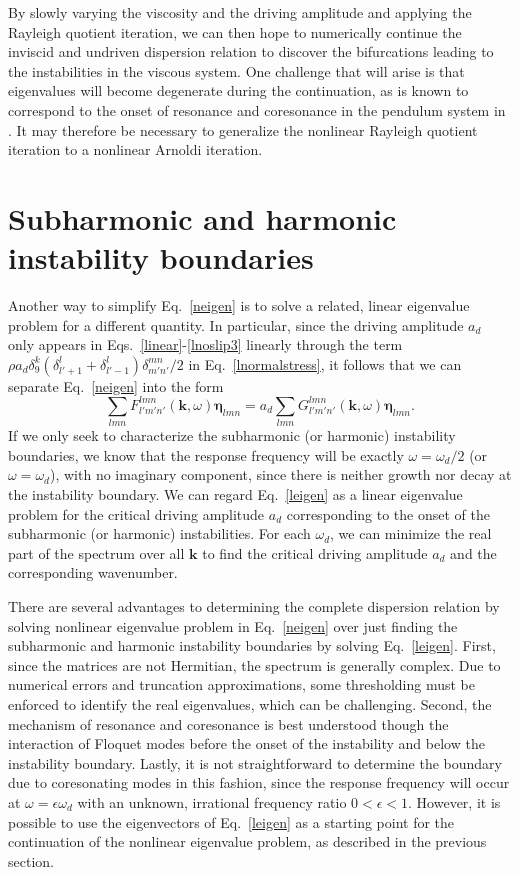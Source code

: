 \documentclass[aps,pre,amsmath,amssymb,floatfix,onecolumn,notitlepage,10pt]{revtex4-1}
\begin{document}
By slowly varying the viscosity and the driving amplitude and applying the Rayleigh quotient iteration, we can then hope to numerically continue the inviscid and undriven dispersion relation to discover the bifurcations leading to the instabilities in the viscous system. One challenge that will arise is that eigenvalues will become degenerate during the continuation, as is known to correspond to the onset of resonance and coresonance in the pendulum system in \cite{2021_Nicolaou_2}. It may therefore be necessary to generalize the nonlinear Rayleigh quotient iteration to a nonlinear Arnoldi iteration.

\section{Subharmonic and harmonic instability boundaries}
Another way to simplify Eq.~\eqref{neigen} is to solve a related, linear eigenvalue problem for a different quantity. In particular, since the driving amplitude $a_d$ only appears in Eqs.~\eqref{linear}-\eqref{lnoslip3} linearly through the term $\rho a_d\delta_9^k(\delta_{l'+1}^l+\delta_{l'-1}^l)\delta_{m'n'}^{mn}/2$ in Eq.~\eqref{lnormalstress}, it follows that we can separate Eq.~\eqref{neigen} into the form
\begin{equation}
\sum_{lmn} F^{lmn}_{l'm'n'}(\mathbf{k},\omega) \bm{\eta}_{lmn} = a_d \sum_{lmn}  G^{lmn}_{l'm'n'}(\mathbf{k},\omega)\bm{\eta}_{lmn}. \label{leigen}
\end{equation}
If we only seek to characterize the subharmonic (or harmonic) instability boundaries, we know that the response frequency will be exactly $\omega  = \omega_d/2$ (or $\omega  = \omega_d$), with no imaginary component, since there is neither growth nor decay at the instability boundary. We can regard Eq.~\eqref{leigen} as a linear eigenvalue problem for the critical driving amplitude $a_d$ corresponding to the onset of the subharmonic (or harmonic) instabilities. For each $\omega_d$, we can minimize the real part of the spectrum over all $\mathbf{k}$ to find the critical driving amplitude $a_d$ and the corresponding wavenumber.

There are several advantages to determining the complete dispersion relation by solving nonlinear eigenvalue problem in Eq.~\eqref{neigen} over just finding the subharmonic and harmonic instability boundaries by solving Eq.~\eqref{leigen}. First, since the matrices are not Hermitian, the spectrum is generally complex. Due to numerical errors and truncation approximations, some thresholding must be enforced to identify the real eigenvalues, which can be challenging. Second, the mechanism of resonance and coresonance is best understood though the interaction of Floquet modes before the onset of the instability and below the instability boundary.  Lastly, it is not straightforward to determine the boundary due to coresonating modes in this fashion, since the response frequency will occur at $\omega = \epsilon \omega_d$ with an unknown, irrational frequency ratio $0<\epsilon<1$. However, it is possible to use the eigenvectors of Eq.~\eqref{leigen} as a starting point for the continuation of the nonlinear eigenvalue problem, as described in the previous section.
\end{document}
